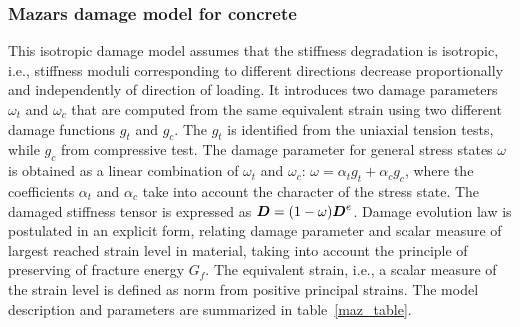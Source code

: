 \documentclass[epsf,a4paper]{article}
\newcommand{\mbf}[1]{\mbox{\boldmath$#1$}}
\begin{document}
\subsubsection{Mazars damage model for concrete}
This isotropic damage model assumes that the stiffness degradation is
isotropic, i.e., stiffness moduli corresponding to different
directions decrease proportionally and independently of direction of
loading. 	
It introduces two damage parameters $\omega_t$ and $\omega_c$ that
are computed from the same equivalent strain using two different damage functions
$g_t$ and $g_c$. The $g_t$ is identified from the uniaxial tension tests, while
$g_c$ from compressive test. The damage parameter for general stress states 
$\omega$ is obtained as a linear combination of $\omega_t$ and $\omega_c$:
$\omega=\alpha_t g_t + \alpha_c g_c$, where the coefficients
$\alpha_t$ and $\alpha_c$ take into account the character of the
stress state.
The damaged stiffness tensor is expressed as
$\mbf{D}=(1-\omega)\mbf{D}^e$.
Damage evolution law is postulated in an explicit form, relating
damage parameter and scalar measure of largest reached strain level in
material, taking into account the principle of preserving of fracture
energy $G_f$. The equivalent strain, i.e., a scalar measure of the
strain level is defined as norm from positive principal strains.
The model description and parameters are summarized
in table~\ref{maz_table}.
\end{document}
